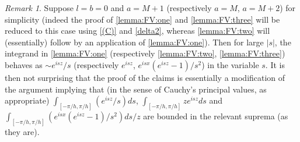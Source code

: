 \documentclass[pdftex,oneside,11pt,reqno]{amsart}
\theoremstyle{definition}
\theoremstyle{theorem}
\theoremstyle{remark}
\newtheorem{remark}{Remark}[section]
\numberwithin{equation}{section}
\numberwithin{definition}{section}
\begin{document}
\begin{remark}
Suppose $l=b=0$ and $a=M+1$ (respectively $a=M$, $a=M+2$) for simplicity (indeed the proof of \eqref{lemma:FV:one} and \eqref{lemma:FV:three} will be reduced to this case using \ref{(C)} and \ref{delta2}, whereas \eqref{lemma:FV:two} will (essentially) follow by an application of \eqref{lemma:FV:one}). Then for large $\vert s\vert$, the integrand in \eqref{lemma:FV:one} (respectively \eqref{lemma:FV:two}, \eqref{lemma:FV:three}) behaves as $\sim e^{isz}/s$ (respectively $e^{isz}$, $e^{isx}(e^{isz}-1)/s^2$) in the variable $s$. It is then not surprising that the proof of the claims is essentially a modification of the argument 
implying that (in the sense of Cauchy's principal values, as appropriate) $\int_{[-\pi/h,\pi/h]}(e^{isz}/s)ds$, $\int_{[-\pi/h,\pi/h]} z e^{isz}ds$ and $\int_{[-\pi/h,\pi/h]}(e^{isx}(e^{isz}-1)/s^2)ds/z$ are bounded in the relevant suprema (as they are).
\end{remark}
\end{document}
